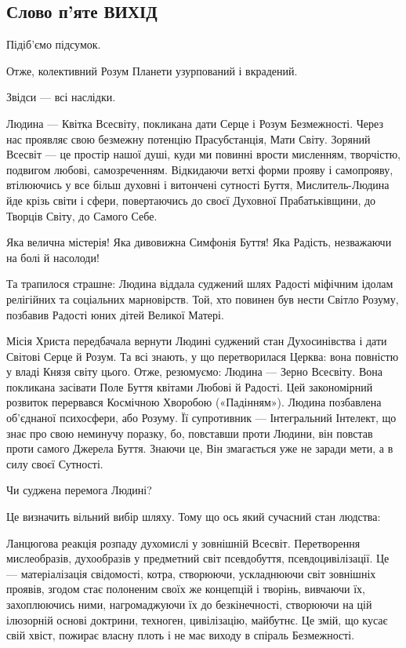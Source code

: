  
 

\subsection{Слово п’яте ВИХІД}

Підіб’ємо підсумок.

Отже, колективний Розум Планети узурпований і вкрадений.

Звідси — всі наслідки.

Людина — Квітка Всесвіту, покликана дати Серце і Розум Безмежності. Через нас
проявляє свою безмежну потенцію Прасубстанція, Мати Світу. Зоряний Всесвіт — це
простір нашої душі, куди ми повинні врости мисленням, творчістю, подвигом
любові, самозреченням. Відкидаючи ветхі форми прояву і самопрояву, втілюючись у
все більш духовні і витончені сутності Буття, Мислитель-Людина йде крізь світи
і сфери, повертаючись до своєї Духовної Прабатьківщини, до Творців Світу, до
Самого Себе.

Яка велична містерія! Яка дивовижна Симфонія Буття! Яка Радість, незважаючи на
болі й насолоди!

Та трапилося страшне: Людина віддала суджений шлях Радості міфічним ідолам
релігійних та соціальних марновірств. Той, хто повинен був нести Світло Розуму,
позбавив Радості юних дітей Великої Матері.

Місія Христа передбачала вернути Людині суджений стан Духосинівства і дати
Світові Серце й Розум. Та всі знають, у що перетворилася Церква: вона повністю
у владі Князя світу цього. Отже, резюмуємо: Людина — Зерно Всесвіту. Вона
покликана засівати Поле Буття квітами Любові й Радості. Цей закономірний
розвиток перервався Космічною Хворобою («Падінням»). Людина позбавлена
об’єднаної психосфери, або Розуму. Її супротивник — Інтегральний Інтелект, що
знає про свою неминучу поразку, бо, повставши проти Людини, він повстав проти
самого Джерела Буття. Знаючи це, Він змагається уже не заради мети, а в силу
своєї Сутності.

Чи суджена перемога Людині?

Це визначить вільний вибір шляху. Тому що ось який сучасний стан людства:

Ланцюгова реакція розпаду духомислі у зовнішній Всесвіт. Перетворення
мислеобразів, духообразів у предметний світ псевдобуття, псевдоцивілізації. Це
— матеріалізація свідомості, котра, створюючи, ускладнюючи світ зовнішніх
проявів, згодом стає полоненим своїх же концепцій і творінь, вивчаючи їх,
захоплюючись ними, нагромаджуючи їх до безкінечності, створюючи на цій
ілюзорній основі доктрини, техноген, цивілізацію, майбутнє. Це змій, що кусає
свій хвіст, пожирає власну плоть і не має виходу в спіраль Безмежності.

